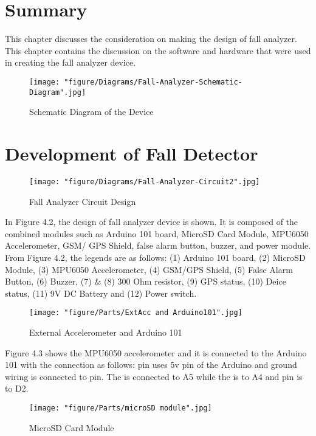 \section{Summary}

This chapter discusses the consideration on making the design of fall analyzer. This chapter contains the discussion on the software and hardware that were used in creating the fall analyzer device.

\begin{figure}[htbp]
	\centering
		\texttt{[image: "figure/Diagrams/Fall-Analyzer-Schematic-Diagram".jpg]}
	\caption{Schematic Diagram of the Device}
	\label{fig:Fall-Analyzer-Schematic-Diagram}
\end{figure}

\section{Development of Fall Detector}

\begin{figure}
	\centering
		\texttt{[image: "figure/Diagrams/Fall-Analyzer-Circuit2".jpg]}
	\caption{Fall Analyzer Circuit Design}
	\label{fig:Fall-Analyzer-Circuit}
\end{figure}

In Figure 4.2, the design of fall analyzer device is shown. It is composed of the combined modules such as Arduino 101 board, MicroSD Card Module, MPU6050 Accelerometer, GSM/ GPS Shield, false alarm button, buzzer, and power module.
From Figure 4.2, the legends are as follows: (1) Arduino 101 board, (2) MicroSD Module, (3) MPU6050 Accelerometer, (4) GSM/GPS Shield, (5) False Alarm Button, (6) Buzzer, (7) \& (8) 300 Ohm resistor, (9) GPS status, (10) Deice status, (11) 9V DC Battery and (12) Power switch.

\begin{figure}[htbp]
	\centering
		\texttt{[image: "figure/Parts/ExtAcc and Arduino101".jpg]}
	\caption{External Accelerometer and Arduino 101}
	\label{fig:ExtAcc and Arduino101}
\end{figure}

Figure 4.3 shows the  MPU6050 accelerometer and it is connected to the Arduino 101 with the connection as follows:  pin uses 5v pin of the Arduino and ground wiring is connected to  pin. The  is connected to A5 while the  is to A4 and  pin is to D2.

\begin{figure}[htbp]
	\centering
		\texttt{[image: "figure/Parts/microSD module".jpg]}
	\caption{MicroSD Card Module}
	\label{fig:microSD module}
\end{figure}

